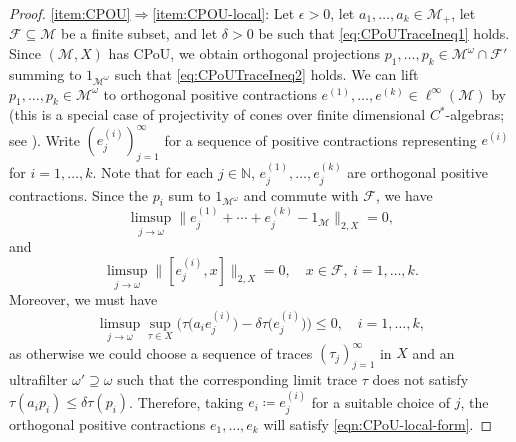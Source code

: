 \documentclass[a4paper,11pt]{amsart}
\theoremstyle{definition}
\numberwithin{equation}{section}
\numberwithin{theorem}{section}
\newcommand{\N}{\mathbb N}
\newcommand{\M}{\mathcal{M}}
\begin{document}
\begin{proof}
	\ref{item:CPOU}$\Rightarrow$\ref{item:CPOU-local}:
	Let $\epsilon > 0$, let $a_1,\dots,a_k \in \M_+$, let $\mathcal{F} \subseteq \M$ be a finite subset, and  let $\delta > 0$ be such that \eqref{eq:CPoUTraceIneq1} holds. 
	Since $(\M, X)$ has CPoU, we obtain orthogonal projections $p_1,\ldots,p_k \in \M^\omega \cap \mathcal F'$ summing to $1_{\mathcal M^\omega}$ such that \eqref{eq:CPoUTraceIneq2} holds. We can lift $p_1,\ldots,p_k \in \M^\omega$ to orthogonal positive contractions $e^{(1)},\ldots,e^{(k)} \in \ell^\infty(\M)$ by \cite[Proposition~2.6]{AP77} (this is a special case of projectivity of cones over finite dimensional $C^*$-algebras; see \cite[Corollary~3.8]{LP98}). 
	Write $(e^{(i)}_j)_{j=1}^\infty$ for a sequence of positive contractions representing $e^{(i)}$ for $i=1,\ldots,k$. 
	Note that for each $j \in \N$, $e^{(1)}_j,\ldots,e^{(k)}_j$ are orthogonal positive contractions. 
	Since the $p_i$ sum to $1_{\M^\omega}$ and commute with $\mathcal{F}$, we have
	\begin{equation}
		\limsup_{j\to \omega} \big\|e^{(1)}_j + \cdots +e^{(k)}_j - 1_{\M}\big\|_{2,X}= 0, 
	\end{equation}
	and
	\begin{equation}
		\limsup_{j\to\omega} \|[e^{(i)}_j,x]\|_{2,X} = 0, \quad x \in \mathcal{F},\ i=1,\ldots,k.
	\end{equation}
	Moreover, we must have
	\begin{equation}
		\limsup_{j\to\omega}\sup_{\tau \in X} \big(\tau\big(a_ie^{(i)}_j\big) - \delta\tau\big(e^{(i)}_j\big)\big) \leq 0, \quad  i = 1, \ldots, k,
	\end{equation}
	as otherwise we could choose a sequence of traces $(\tau_j)_{j=1}^\infty$ in $X$ and an ultrafilter $\omega' \supseteq \omega$ such that the corresponding limit trace $\tau$ does not satisfy $\tau(a_ip_i) \leq \delta \tau(p_i)$.
	Therefore, taking $e_i \coloneqq e^{(i)}_j$ for a suitable choice of $j$, the orthogonal positive contractions $e_1,\ldots,e_k$ will satisfy
	\eqref{eqn:CPoU-local-form}.
	

\end{proof}
\end{document}
